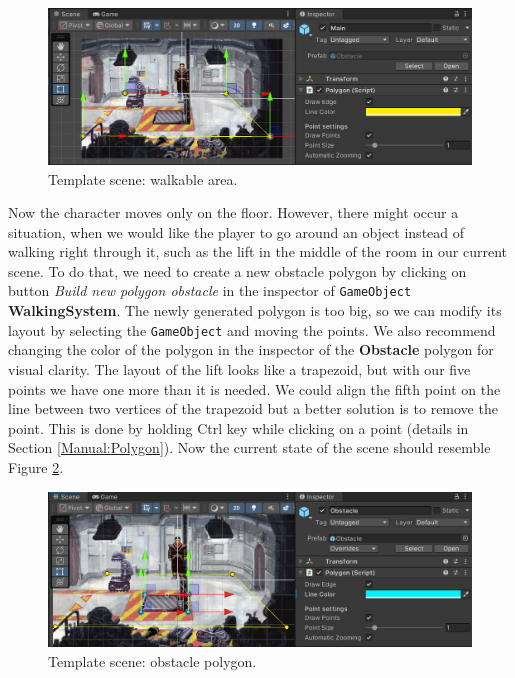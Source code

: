 \begin{figure}[H]
\centering
\includegraphics[width=1\linewidth]{img/User doc/image_2025-07-08_104843701.png}
\caption{Template scene: walkable area.}
\label{fig:Tutorial-template:main}
\end{figure}

Now the character moves only on the floor. However, there might occur a situation, when we would like the player to go around an object instead of walking right through it, such as the lift in the middle of the room in our current scene. To do that, we need to create a new obstacle polygon by clicking on button \textit{Build new polygon obstacle} in the inspector of \verb|GameObject| \textbf{WalkingSystem}. The newly generated polygon is too big, so we can modify its layout by selecting the \verb|GameObject| and moving the points. We also recommend changing the color of the polygon in the inspector of the \textbf{Obstacle} polygon for visual clarity. The layout of the lift looks like a trapezoid, but with our five points we have one more than it is needed. We could align the fifth point on the line between two vertices of the trapezoid but a better solution is to remove the point. This is done by holding Ctrl key while clicking on a point (details in Section \ref{Manual:Polygon}). Now the current state of the scene should resemble Figure \ref{fig:Tutorial-template:obstacle}.

\begin{figure}[H]
\centering
\includegraphics[width=1\linewidth]{img/User doc/image_2025-07-08_110642921.png}
\caption{Template scene: obstacle polygon.}
\label{fig:Tutorial-template:obstacle}
\end{figure}

